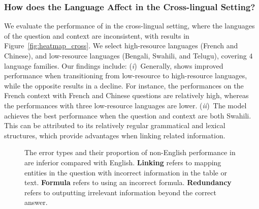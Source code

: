 \subsubsection{How does the Language Affect \ourmethod in the Cross-lingual Setting?}
We evaluate the performance of \ourmethod in the cross-lingual setting, where the languages of the question and context are inconsistent, with results in Figure~\ref{fig:heatmap_cross}. 
We select high-resource languages (French and Chinese), and low-resource languages (Bengali, Swahili, and Telugu), covering $4$ language families. 
Our findings include:
(\emph{i})~Generally, \ourmethod shows improved performance when transitioning from low-resource to high-resource languages, while the opposite results in a decline. 
For instance, the performances on the French context with French and Chinese questions are relatively high, whereas the performances with three low-resource languages are lower.
(\emph{ii})~The model achieves the best performance when the question and context are both Swahili. 
This can be attributed to its relatively regular grammatical and lexical structures, which provide advantages when linking related information.

% 

\begin{figure}[t]
    \centering
    
    \caption{
    The error types and their proportion of non-English performance in \ourmethod are inferior compared with English. 
    \textbf{Linking} refers to mapping entities in the question with incorrect information in the table or text. 
    \textbf{Formula} refers to using an incorrect formula. 
    \textbf{Redundancy} refers to outputting irrelevant information beyond the correct answer. 
    }
    \label{fig:error}
    \vspace{-1em}
\end{figure}

